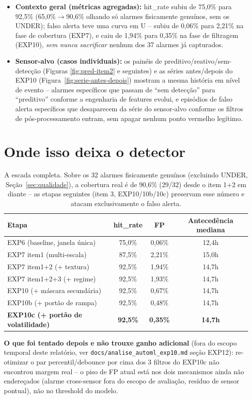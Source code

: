 \documentclass[11pt,a4paper]{article}
\begin{document}
\begin{itemize}
  \item \textbf{Contexto geral (métricas agregadas):} hit\_rate subiu de
        75,0\% para 92,5\% (65,0\%$\to$90,6\% olhando só alarmes
        fisicamente genuínos, sem os UNDER); falso alerta teve uma curva
        em U -- subiu de 0,06\% para 2,21\% na fase de cobertura (EXP7),
        e caiu de 1,94\% para 0,35\% na fase de filtragem (EXP10), \emph{sem
        nunca sacrificar} nenhum dos 37 alarmes já capturados.
  \item \textbf{Sensor-alvo (casos individuais):} os painéis de
        preditivo/reativo/sem-detecção (Figuras \ref{fig:pred-item2} e
        seguintes) e as séries antes/depois do EXP10
        (Figura~\ref{fig:serie-antes-depois}) mostram a mesma história em
        nível de evento -- alarmes específicos que passam de ``sem
        detecção'' para ``preditivo'' conforme a engenharia de features
        evolui, e episódios de falso alerta específicos que desaparecem
        da série do sensor-alvo conforme os filtros de pós-processamento
        entram, sem apagar nenhum ponto vermelho legítimo.
\end{itemize}

\section{Onde isso deixa o detector}

\begin{table}[H]
\centering
\small
\begin{tabular}{@{}lccc@{}}
\toprule
\textbf{Etapa} & \textbf{hit\_rate} & \textbf{FP} & \textbf{Antecedência mediana} \\
\midrule
EXP6 (baseline, janela única) & 75,0\% & 0,06\% & 12,4h \\
EXP7 item1 (multi-escala) & 87,5\% & 2,21\% & 15,0h \\
EXP7 item1+2 (+ textura) & 92,5\% & 1,94\% & 14,7h \\
EXP7 item1+2+3 (+ regime) & 92,5\% & 1,93\% & 14,7h \\
EXP10 (+ máscara secundária) & 92,5\% & 0,67\% & 14,7h \\
EXP10b (+ portão de rampa) & 92,5\% & 0,48\% & 14,7h \\
\textbf{EXP10c (+ portão de volatilidade)} & \textbf{92,5\%} & \textbf{0,35\%} & \textbf{14,7h} \\
\bottomrule
\end{tabular}
\caption{A escada completa. Sobre os 32 alarmes fisicamente genuínos
(excluindo UNDER, Seção~\ref{sec:qualidade}), a cobertura real é de
90,6\% (29/32) desde o item 1+2 em diante -- as etapas seguintes (item 3,
EXP10/10b/10c) preservam esse número e atacam exclusivamente o falso
alerta.}
\end{table}

\textbf{O que foi tentado depois e não trouxe ganho adicional} (fora do
escopo temporal deste relatório, ver \texttt{docs/analise\_automl\_exp10.md}
seção EXP12): re-otimizar o par percentil/debounce por cima dos 3 filtros
do EXP10c não encontrou margem real -- o piso de FP atual está nos dois
mecanismos ainda não endereçados (alarme cross-sensor fora do escopo de
avaliação, resíduo de sensor pontual), não no threshold do modelo.
\end{document}
